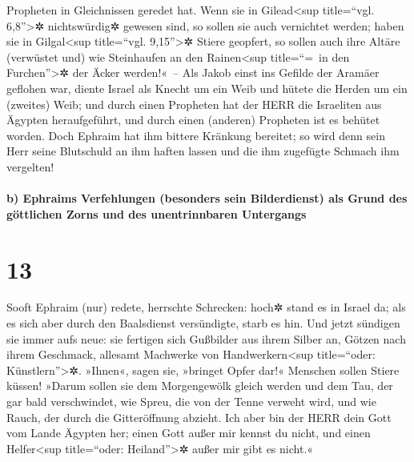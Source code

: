 Propheten in Gleichnissen geredet hat.  Wenn sie in
Gilead\textless sup title=``vgl. 6,8''\textgreater✲ nichtswürdig✲
gewesen sind, so sollen sie auch vernichtet werden; haben sie in
Gilgal\textless sup title=``vgl. 9,15''\textgreater✲ Stiere geopfert, so
sollen auch ihre Altäre (verwüstet und) wie Steinhaufen an den
Rainen\textless sup title=``=~in den Furchen''\textgreater✲ der Äcker
werden!«~--  Als Jakob einst ins Gefilde der Aramäer
geflohen war, diente Israel als Knecht um ein Weib und hütete die Herden
um ein (zweites) Weib;  und durch einen Propheten hat der
HERR die Israeliten aus Ägypten heraufgeführt, und durch einen (anderen)
Propheten ist es behütet worden.  Doch Ephraim hat ihm
bittere Kränkung bereitet; so wird denn sein Herr seine Blutschuld an
ihm haften lassen und die ihm zugefügte Schmach ihm vergelten!

\hypertarget{b-ephraims-verfehlungen-besonders-sein-bilderdienst-als-grund-des-guxf6ttlichen-zorns-und-des-unentrinnbaren-untergangs}{%
\paragraph{b) Ephraims Verfehlungen (besonders sein Bilderdienst) als
Grund des göttlichen Zorns und des unentrinnbaren
Untergangs}\label{b-ephraims-verfehlungen-besonders-sein-bilderdienst-als-grund-des-guxf6ttlichen-zorns-und-des-unentrinnbaren-untergangs}}

\hypertarget{section-12}{%
\section{13}\label{section-12}}

 Sooft Ephraim (nur) redete, herrschte Schrecken: hoch✲
stand es in Israel da; als es sich aber durch den Baalsdienst
versündigte, starb es hin.  Und jetzt sündigen sie immer
aufs neue: sie fertigen sich Gußbilder aus ihrem Silber an, Götzen nach
ihrem Geschmack, allesamt Machwerke von Handwerkern\textless sup
title=``oder: Künstlern''\textgreater✲. »Ihnen«, sagen sie, »bringet
Opfer dar!« Menschen sollen Stiere küssen!  »Darum sollen
sie dem Morgengewölk gleich werden und dem Tau, der gar bald
verschwindet, wie Spreu, die von der Tenne verweht wird, und wie Rauch,
der durch die Gitteröffnung abzieht.  Ich aber bin der
HERR dein Gott vom Lande Ägypten her; einen Gott außer mir kennst du
nicht, und einen Helfer\textless sup title=``oder:
Heiland''\textgreater✲ außer mir gibt es nicht.«

